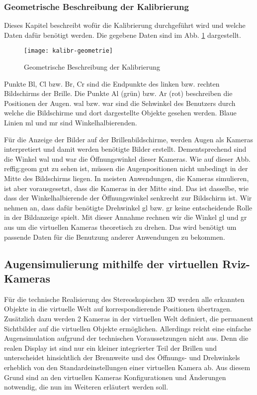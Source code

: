 \subsubsection{Geometrische Beschreibung der Kalibrierung}
Dieses Kapitel beschreibt wofür die Kalibrierung durchgeführt wird und welche Daten dafür benötigt werden.
Die gegebene Daten sind im Abb. \ref{fig:geom} dargestellt. 

\begin{figure}[h]
   \centering
   \texttt{[image: kalibr-geometrie]}
   \caption{Geometrische Beschreibung der Kalibrierung}
   \label{fig:geom}
\end{figure}

Punkte Bl, Cl bzw. Br, Cr sind die Endpunkte des linken bzw. rechten Bildschirms der Brille.
Die Punkte Al (grün) bzw. Ar (rot) beschreiben die Positionen der Augen.
wal bzw. war sind die Sehwinkel des Benutzers durch welche die Bildschirme und dort dargestellte Objekte gesehen werden. 
Blaue Linien ml und mr sind Winkelhalbierenden.

Für die Anzeige der Bilder auf der Brillenbildschirme, werden Augen als Kameras interpretiert und damit werden benötigte Bilder erstellt.
Dementsprechend sind die Winkel wal und war die Öffnungswinkel dieser Kameras.
Wie auf dieser Abb. ref{fig:geom} gut zu sehen ist, müssen die Augenpositionen nicht unbedingt in der Mitte des Bildschirms liegen.
In meisten Anwendungen, die Kameras simulieren, ist aber vorausgesetzt, dass die Kameras in der Mitte sind.
Das ist dasselbe, wie dass der Winkelhalbierende der Öffnungswinkel senkrecht zur Bildschirm ist.
Wir nehmen an, dass dafür benötigte Drehwinkel gl bzw. gr keine entscheidende Rolle in der Bildanzeige spielt.
Mit dieser Annahme rechnen wir die Winkel gl und gr aus  um die virtuellen Kameras theoretisch zu drehen.
Das wird benötigt um passende Daten für die Benutzung anderer Anwendungen zu bekommen.

\subsection{Augensimulierung mithilfe der virtuellen Rviz-Kameras }
Für die technische Realisierung des Stereoskopischen 3D werden alle erkannten Objekte in die virtuelle Welt auf korrespondierende Positionen übertragen. Zusätzlich dazu werden 2 Kameras in der virtuellen Welt definiert, die permanent Sichtbilder auf die virtuellen Objekte ermöglichen. Allerdings reicht eine einfache Augensimulation aufgrund der technischen Voraussetzungen nicht aus. Denn die realen Display ist sind nur ein kleiner integrierter Teil der Brillen und unterscheidet hinsichtlich der Brennweite und des Öffnungs- und Drehwinkels erheblich von den Standardeinstellungen einer virtuellen Kamera ab. Aus diesem Grund sind an den virtuellen Kameras Konfigurationen und Änderungen notwendig, die nun im Weiteren erläutert werden soll. 


